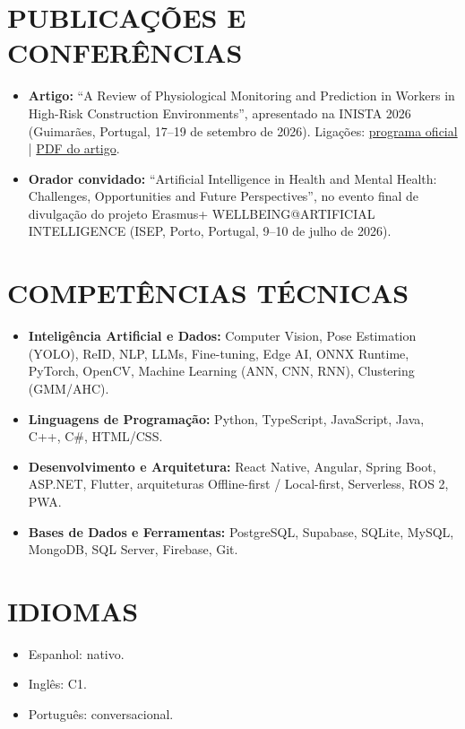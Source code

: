 \documentclass[10pt,a4paper]{article}
\begin{document}
\section*{PUBLICAÇÕES E CONFERÊNCIAS}
\begin{itemize}
    \item \textbf{Artigo:} ``A Review of Physiological Monitoring and Prediction in Workers in High-Risk Construction Environments'', apresentado na INISTA 2026 (Guimarães, Portugal, 17--19 de setembro de 2026). Ligações: \href{https://inista2026.di.uminho.pt/pdf/INISTA\_Official\_Program.pdf}{programa oficial} | \href{https://drive.google.com/file/d/1Kh2M0t4dUh3F5vFrKY5sZMfaRxV1H2PT/view?usp=sharing}{PDF do artigo}.
    \item \textbf{Orador convidado:} ``Artificial Intelligence in Health and Mental Health: Challenges, Opportunities and Future Perspectives'', no evento final de divulgação do projeto Erasmus+ WELLBEING@ARTIFICIAL INTELLIGENCE (ISEP, Porto, Portugal, 9--10 de julho de 2026).
\end{itemize}

\section*{COMPETÊNCIAS TÉCNICAS}
\begin{itemize}
    \item \textbf{Inteligência Artificial e Dados:} Computer Vision, Pose Estimation (YOLO), ReID, NLP, LLMs, Fine-tuning, Edge AI, ONNX Runtime, PyTorch, OpenCV, Machine Learning (ANN, CNN, RNN), Clustering (GMM/AHC).
    \item \textbf{Linguagens de Programação:} Python, TypeScript, JavaScript, Java, C++, C\#, HTML/CSS.
    \item \textbf{Desenvolvimento e Arquitetura:} React Native, Angular, Spring Boot, ASP.NET, Flutter, arquiteturas Offline-first / Local-first, Serverless, ROS 2, PWA.
    \item \textbf{Bases de Dados e Ferramentas:} PostgreSQL, Supabase, SQLite, MySQL, MongoDB, SQL Server, Firebase, Git.
\end{itemize}

\section*{IDIOMAS}
\begin{itemize}
    \item Espanhol: nativo.
    \item Inglês: C1.
    \item Português: conversacional.
\end{itemize}
\end{document}
